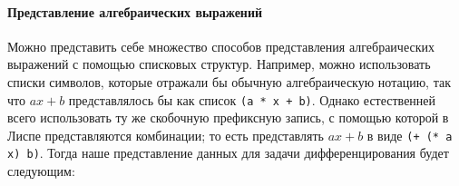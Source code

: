 \paragraph{Представление алгебраических выражений}


Можно представить себе множество способов представления
алгебраических выражений с помощью списковых структур. Например, можно 
использовать списки символов, которые отражали бы обычную
алгебраическую нотацию, так что $ax + b$ представлялось бы
как список {\tt (a * x + b)}.  Однако естественней всего
использовать ту же скобочную префиксную запись, с помощью которой в
Лиспе представляются комбинации; то есть представлять $ax +
b$ в виде {\tt (+ (* a x) b)}.  Тогда наше представление
данных для задачи дифференцирования будет следующим:

